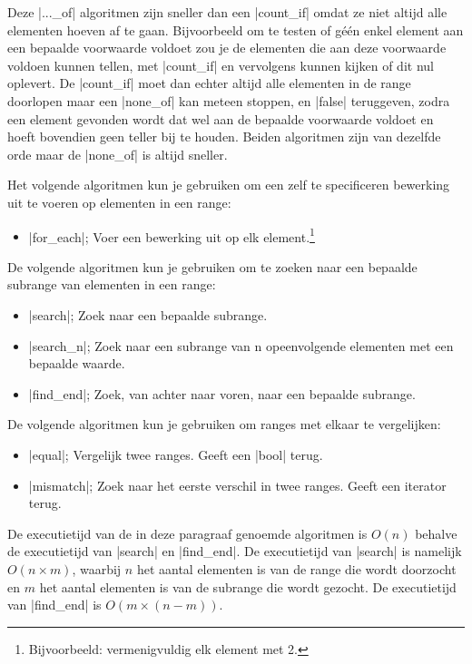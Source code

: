 \begin{cpplstShortInline}
Deze |..._of| algoritmen zijn sneller dan een |count_if| omdat ze niet altijd alle elementen hoeven af te gaan.
Bijvoorbeeld om te testen of géén enkel element aan een bepaalde voorwaarde voldoet zou je de elementen die aan deze voorwaarde voldoen kunnen tellen, met |count_if| en vervolgens kunnen kijken of dit nul oplevert.
De |count_if| moet dan echter altijd alle elementen in de range doorlopen maar een |none_of| kan meteen stoppen, en |false| teruggeven, zodra een element gevonden wordt dat wel aan de bepaalde voorwaarde voldoet en hoeft bovendien geen teller bij te houden.
Beiden algoritmen zijn van dezelfde orde maar de |none_of| is altijd sneller.

Het volgende algoritmen kun je gebruiken om een zelf te specificeren bewerking uit te voeren op elementen in een range:
\begin{itemize}
	\item |for_each|; Voer een bewerking uit op elk element.\footnote{%
		Bijvoorbeeld: vermenigvuldig elk element met 2.
	}
\end{itemize}

De volgende algoritmen kun je gebruiken om te zoeken naar een bepaalde subrange van elementen in een range:
\begin{itemize}
	\item |search|; Zoek naar een bepaalde subrange.
	\item |search_n|; Zoek naar een subrange van n opeenvolgende elementen met een bepaalde waarde.
	\item |find_end|\footnotemark{}; Zoek, van achter naar voren, naar een bepaalde subrange.
\end{itemize}

De volgende algoritmen kun je gebruiken om ranges met elkaar te vergelijken:
\begin{itemize}
	\item |equal|; Vergelijk twee ranges.
	Geeft een |bool| terug.
	\item |mismatch|; Zoek naar het eerste verschil in twee ranges.
	Geeft een iterator terug.
\end{itemize}

De executietijd van de in deze paragraaf genoemde algoritmen is $O(n)$ behalve de executietijd van |search| en |find_end|.
De executietijd van |search| is namelijk $O(n\times{}m)$, waarbij $n$ het aantal elementen is van de range die wordt doorzocht en $m$ het aantal elementen is van de subrange die wordt gezocht.
De executietijd van |find_end| is $O(m\times{}(n-m))$.


\end{cpplstShortInline}

